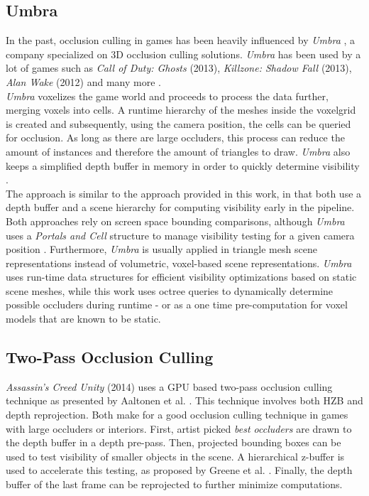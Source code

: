 \subsection*{Umbra}

In the past, occlusion culling in games has been heavily influenced by \emph{Umbra} \cite{Umbra2024}, a company 
specialized on 3D occlusion culling solutions. \emph{Umbra} has been used by a lot of games such as 
\emph{Call of Duty: Ghosts} (2013), \emph{Killzone: Shadow Fall} (2013), \emph{Alan Wake} (2012) and many more 
\cite{UmbraWiki,CallOfDutyGhostsCredits,KillzoneUmbra,AlanWakeUmbra}. \\

\noindent
\emph{Umbra} voxelizes the game world and proceeds to process the data further, merging voxels into cells. 
A runtime hierarchy of the meshes inside the voxelgrid is created and subsequently, using the camera position, 
the cells can be queried for occlusion. As long as there are large occluders, this process can reduce the amount 
of instances and therefore the amount of triangles to draw. \emph{Umbra} also keeps a simplified depth buffer in 
memory in order to quickly determine visibility \cite{Medium2018}. \\

\noindent 
The approach is similar to the approach provided  in this work, in that both use a depth buffer and a scene hierarchy 
for computing visibility early in the pipeline. Both approaches rely on screen space bounding comparisons, although 
\emph{Umbra} uses a \emph{Portals and Cell} structure to manage visibility testing for a given camera position 
\cite{Medium2018}. Furthermore, \emph{Umbra} is usually applied in triangle mesh scene representations instead 
of volumetric, voxel-based scene representations. \emph{Umbra} uses run-time data structures for efficient visibility 
optimizations based on static scene meshes, while this work uses octree queries to dynamically determine possible 
occluders during runtime - or as a one time pre-computation for voxel models that are known to be static. \\


\subsection*{Two-Pass Occlusion Culling}

\noindent
\emph{Assassin's Creed Unity} (2014) uses a \ac{GPU} based two-pass occlusion culling technique as presented by 
Aaltonen et al. \cite{Aaltonen2015}. This technique involves both \ac{HZB} and depth reprojection. Both make for 
a good occlusion culling technique in games with large occluders or interiors. First, artist picked 
\emph{best occluders} are drawn to the depth buffer in a depth pre-pass. Then, projected bounding boxes can be 
used to test visibility of smaller objects in the scene. A hierarchical z-buffer is used to accelerate this testing,
as proposed by Greene et al. \cite{Greene93,Greene95}. Finally, the depth buffer of the last frame can be 
reprojected to further minimize computations. \\

